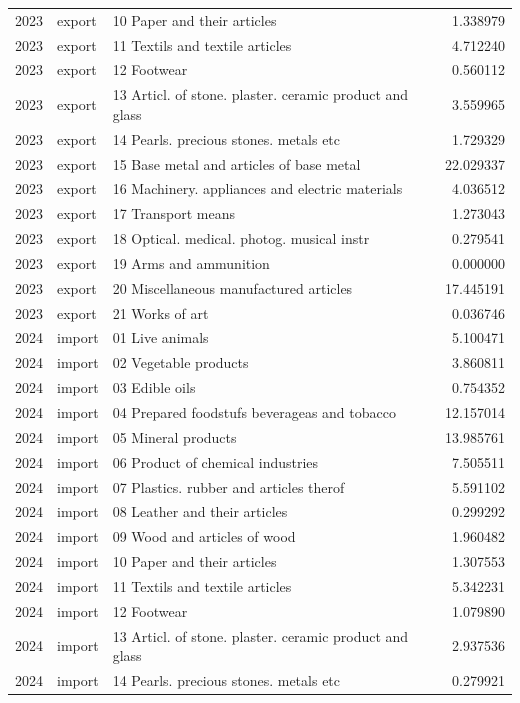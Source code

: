 \begin{tabular}{rllr}
2023 & export & 10 Paper and their articles & 1.338979 \\
2023 & export & 11 Textils and textile articles & 4.712240 \\
2023 & export & 12 Footwear & 0.560112 \\
2023 & export & 13 Articl. of stone. plaster. ceramic product and glass & 3.559965 \\
2023 & export & 14 Pearls. precious stones. metals etc & 1.729329 \\
2023 & export & 15 Base metal and articles of base metal & 22.029337 \\
2023 & export & 16 Machinery. appliances and electric materials & 4.036512 \\
2023 & export & 17 Transport means & 1.273043 \\
2023 & export & 18 Optical. medical. photog. musical instr & 0.279541 \\
2023 & export & 19 Arms and ammunition & 0.000000 \\
2023 & export & 20 Miscellaneous manufactured articles & 17.445191 \\
2023 & export & 21 Works of art & 0.036746 \\
2024 & import & 01 Live animals & 5.100471 \\
2024 & import & 02 Vegetable products & 3.860811 \\
2024 & import & 03 Edible oils & 0.754352 \\
2024 & import & 04 Prepared foodstufs beverageas and tobacco & 12.157014 \\
2024 & import & 05 Mineral products & 13.985761 \\
2024 & import & 06 Product of chemical industries & 7.505511 \\
2024 & import & 07 Plastics. rubber and articles therof & 5.591102 \\
2024 & import & 08 Leather and their articles & 0.299292 \\
2024 & import & 09 Wood and articles of wood & 1.960482 \\
2024 & import & 10 Paper and their articles & 1.307553 \\
2024 & import & 11 Textils and textile articles & 5.342231 \\
2024 & import & 12 Footwear & 1.079890 \\
2024 & import & 13 Articl. of stone. plaster. ceramic product and glass & 2.937536 \\
2024 & import & 14 Pearls. precious stones. metals etc & 0.279921 \\

\end{tabular}
